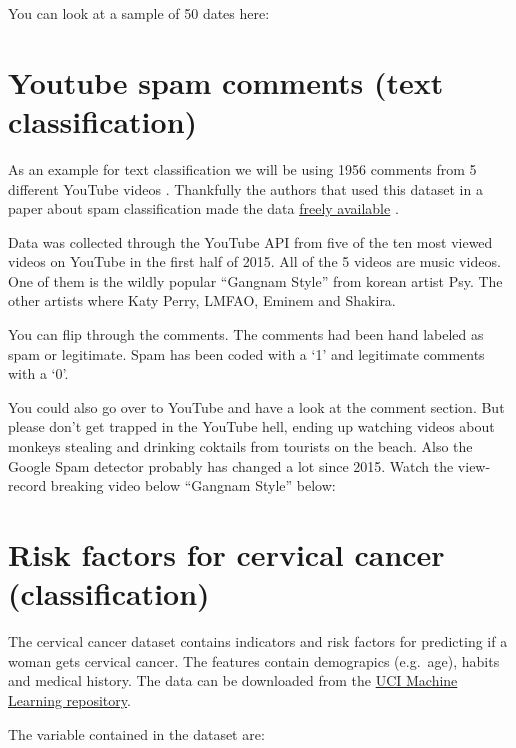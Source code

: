 \documentclass[12pt,]{krantz}
\theoremstyle{definition}
\theoremstyle{definition}
\theoremstyle{definition}
\theoremstyle{remark}
\begin{document}
You can look at a sample of 50 dates here:

\hypertarget{htmlwidget-555866c809bfad2b4283}{}

\section{Youtube spam comments (text classification)}\label{spam.data}

As an example for text classification we will be using 1956 comments
from 5 different YouTube videos . Thankfully the authors that used this
dataset in a paper about spam classification made the data
\href{http://dcomp.sor.ufscar.br/talmeida/youtubespamcollection/}{freely
available} \citep{alberto2015tubespam}.

Data was collected through the YouTube API from five of the ten most
viewed videos on YouTube in the first half of 2015. All of the 5 videos
are music videos. One of them is the wildly popular ``Gangnam Style''
from korean artist Psy. The other artists where Katy Perry, LMFAO,
Eminem and Shakira.

You can flip through the comments. The comments had been hand labeled as
spam or legitimate. Spam has been coded with a `1' and legitimate
comments with a `0'.

\hypertarget{htmlwidget-acfbc291d93045d4b13d}{}

You could also go over to YouTube and have a look at the comment
section. But please don't get trapped in the YouTube hell, ending up
watching videos about monkeys stealing and drinking coktails from
tourists on the beach. Also the Google Spam detector probably has
changed a lot since 2015. Watch the view-record breaking video below
``Gangnam Style'' below:

\section{Risk factors for cervical cancer
(classification)}\label{cervical.data}

The cervical cancer dataset contains indicators and risk factors for
predicting if a woman gets cervical cancer. The features contain
demograpics (e.g.~age), habits and medical history. The data can be
downloaded from the
\href{https://archive.ics.uci.edu/ml/datasets/Cervical+cancer+\%28Risk+Factors\%29}{UCI
Machine Learning repository}.

The variable contained in the dataset are:
\end{document}
